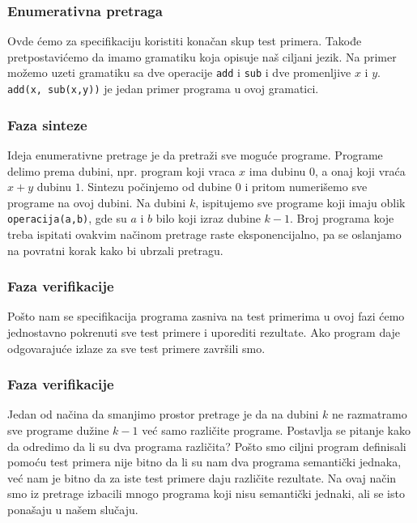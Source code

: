 \subsubsection{Enumerativna pretraga}
\label{subsec:EnumerativnaPretragaCegis}

Ovde ćemo za specifikaciju koristiti konačan skup test primera. Takođe pretpostavićemo da imamo gramatiku koja opisuje naš ciljani jezik. Na primer možemo uzeti gramatiku sa dve operacije \texttt{add} i \texttt{sub} i dve promenljive $x$ i $y$. \texttt{add(x, sub(x,y))} je jedan primer programa u ovoj gramatici.


\subsubsection{Faza sinteze}


Ideja enumerativne pretrage je da pretraži sve moguće programe. Programe delimo prema dubini, npr. program koji vraca $x$ ima dubinu $0$, a onaj koji vraća $x+y$ dubinu $1$.
Sintezu počinjemo od dubine $0$ i pritom numerišemo sve programe na ovoj dubini. Na dubini $k$, ispitujemo sve programe koji imaju oblik \texttt{operacija(a,b)}, gde su $a$ i $b$ bilo koji izraz dubine $k-1$. Broj programa koje treba ispitati ovakvim načinom pretrage raste eksponencijalno, pa se oslanjamo na povratni korak kako bi ubrzali pretragu.


\subsubsection{Faza verifikacije}


Pošto nam se specifikacija programa zasniva na test primerima u ovoj fazi ćemo jednostavno pokrenuti sve test primere i uporediti rezultate. Ako program daje odgovarajuće izlaze za sve test primere završili smo.


\subsubsection{Faza verifikacije}


Jedan od načina da smanjimo prostor pretrage je da na dubini $k$ ne razmatramo sve programe dužine $k-1$ već samo različite programe. Postavlja se pitanje kako da odredimo da li su dva programa različita? Pošto smo ciljni program definisali pomoću test primera nije bitno da li su nam dva programa semantički jednaka, već nam je bitno da za iste test primere daju različite rezultate. Na ovaj način smo iz pretrage izbacili mnogo programa koji nisu semantički jednaki, ali se isto ponašaju u našem slučaju.
